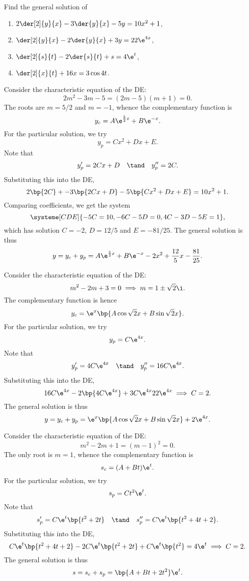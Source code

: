\begin{problem}
    Find the general solution of
    \begin{enumerate}
        \item $2\der[2]{y}{x} - 3\der{y}{x} - 5y = 10x^2 + 1$,
        \item $\der[2]{y}{x} - 2\der{y}{x} + 3y = 22\e^{4x}$,
        \item $\der[2]{s}{t} - 2\der{s}{t} + s = 4\e^t$,
        \item $\der[2]{x}{t} + 16x = 3\cos 4t$.
    \end{enumerate}
\end{problem}
\begin{solution}
    \begin{ppart}
        Consider the characteristic equation of the DE: \[2m^2 - 3m - 5 = (2m-5)(m+1) = 0.\] The roots are $m = 5/2$ and $m = -1$, whence the complementary function is \[y_c = A \e^{\frac52x} + B \e^{-x}.\] For the particular solution, we try \[y_p = Cx^2 + Dx + E.\] Note that \[y_p' = 2Cx + D \quad \tand \quad y_p'' = 2C.\] Substituting this into the DE, \[2\bp{2C} + -3\bp{2Cx + D} - 5\bp{Cx^2 + Dx + E} = 10x^2 + 1.\] Comparing coefficients, we get the system \[\systeme[CDE]{-5C = 10,-6C-5D = 0,4C-3D-5E=1},\] which has solution $C = -2$, $D = 12/5$ and $E = -81/25$. The general solution is thus \[y = y_c + y_p = A \e^{\frac52x} + B \e^{-x} - 2x^2 + \frac{12}5 x - \frac{81}{25}.\]
    \end{ppart}
    \begin{ppart}
        Consider the characteristic equation of the DE: \[m^2 - 2m + 3 = 0 \implies m = 1 \pm \sqrt{2} \i.\] The complementary function is hence \[y_c = \e^x \bp{A\cos \sqrt{2}x + B\sin \sqrt{2}x}.\] For the particular solution, we try \[y_p = C\e^{4x}.\] Note that \[y_p' = 4C\e^{4x} \quad \tand \quad y_p'' = 16C\e^{4x}.\] Substituting this into the DE, \[16C\e^{4x} - 2\bp{4C\e^{4x}} + 3C\e^{4x}  22\e^{4x} \implies C = 2.\] The general solution is thus \[y = y_c + y_p = \e^x \bp{A \cos \sqrt{2}x + B \sin \sqrt{2}x} + 2\e^{4x}.\]
    \end{ppart}
    \begin{ppart}
        Consider the characteristic equation of the DE: \[m^2 - 2m + 1 = (m-1)^2 = 0.\] The only root is $m = 1$, whence the complementary function is \[s_c = (A + Bt) \e^{t}.\] For the particular solution, we try \[s_p = Ct^2 \e^t.\] Note that \[s_p' = C\e^t\bp{t^2 + 2t} \quad \tand \quad s_p'' = C\e^t \bp{t^2 + 4t + 2}.\] Substituting this into the DE, \[C\e^t \bp{t^2 + 4t + 2} - 2C\e^t \bp{t^2 + 2t} + C\e^t \bp{t^2} = 4\e^t \implies C = 2.\] The general solution is thus \[s = s_c + s_p = \bp{A + Bt + 2t^2} \e^{t}.\]

\end{ppart}
\end{solution}
